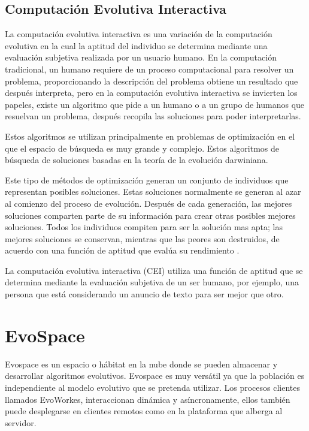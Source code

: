 \clearpage
\subsection{Computación Evolutiva Interactiva}

La computación evolutiva interactiva es una variación de la computación evolutiva en la cual la aptitud del individuo se determina mediante una evaluación subjetiva realizada por un usuario humano. En la computación tradicional, un humano requiere de un proceso computacional para resolver un problema, proporcionando la descripción del problema obtiene un resultado que después interpreta, pero en la computación evolutiva interactiva se invierten los papeles, existe un algoritmo que pide a un humano o a un grupo de humanos que resuelvan un problema, después recopila las soluciones para poder interpretarlas.\cite{dao2012novel}

Estos algoritmos se utilizan principalmente en problemas de optimización en el que el espacio de búsqueda es muy grande y complejo. Estos algoritmos de búsqueda de soluciones basadas en la teoría de la evolución darwiniana.
 
Este tipo de métodos de optimización generan un conjunto de individuos que representan posibles soluciones. Estas soluciones normalmente se generan al azar al comienzo del proceso de evolución. Después de cada generación, las mejores soluciones comparten parte de su información para crear otras posibles mejores soluciones. Todos los individuos compiten para ser la solución mas apta; las mejores soluciones se conservan, mientras que las peores son destruidos, de acuerdo con una función de aptitud que evalúa su rendimiento \cite{back1996evolutionary}. 

La computación evolutiva interactiva (CEI) utiliza una función de aptitud que se determina mediante la evaluación subjetiva de un ser humano, por ejemplo, una persona que está considerando un anuncio de texto para ser mejor que otro.

\clearpage
\section{EvoSpace}

Evospace es un espacio o hábitat en la nube donde se pueden almacenar y desarrollar algoritmos evolutivos. Evospace es muy versátil ya que la población es  independiente al modelo evolutivo que se pretenda utilizar. Los procesos clientes llamados EvoWorkes, interaccionan dinámica y asíncronamente, ellos también puede desplegarse en clientes remotos como en la plataforma que alberga al servidor.\cite{garcia2013evospace}
